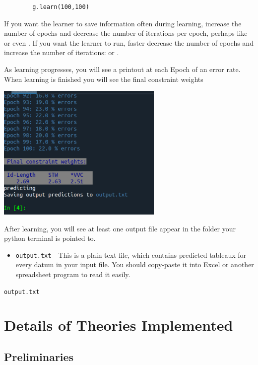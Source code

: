 \documentclass[12]{article}
\begin{document}
	\begin{verbatim}
		g.learn(100,100)
	\end{verbatim}


	
If you want the learner to save information often during learning, increase the number of epochs and decrease the number of iterations per epoch, perhaps like  or even .  If you want the learner to run, faster decrease the number of epochs and increase the number of iterations:  or .

As learning progresses, you will see a printout at each Epoch of an error rate.  When learning is finished you will see the final constraint weights

\includegraphics[width=0.6\textwidth]{embeddedImages/epochPrintout.png}

After learning, you will see at least one output file appear in the folder your python terminal is pointed to.

\begin{itemize}
	\item \texttt{output.txt} - This is a plain text file, which contains predicted tableaux for every datum in your input file.  You should copy-paste it into Excel or another spreadsheet program to read it easily.
\end{itemize}

\texttt{output.txt}


\section{Details of Theories Implemented}
	\subsection{Preliminaries}
\end{document}
